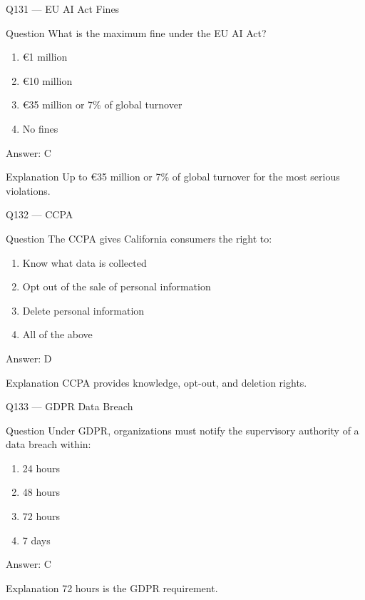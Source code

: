 \documentclass[aspectratio=169,8pt]{beamer}
\begin{document}
	\begin{frame}{Q131 --- EU AI Act Fines}
		\begin{block}{Question}
			What is the maximum fine under the EU AI Act?
		\end{block}
		\begin{enumerate}
			\item €1 million
			\item €10 million
			\item €35 million or 7\% of global turnover
			\item No fines
		\end{enumerate}
		\begin{exampleblock}{Answer: C}\end{exampleblock}
		\begin{block}{Explanation}
			Up to €35 million or 7\% of global turnover for the most serious violations.
		\end{block}
	\end{frame}
	
	\begin{frame}{Q132 --- CCPA}
		\begin{block}{Question}
			The CCPA gives California consumers the right to:
		\end{block}
		\begin{enumerate}
			\item Know what data is collected
			\item Opt out of the sale of personal information
			\item Delete personal information
			\item All of the above
		\end{enumerate}
		\begin{exampleblock}{Answer: D}\end{exampleblock}
		\begin{block}{Explanation}
			CCPA provides knowledge, opt-out, and deletion rights.
		\end{block}
	\end{frame}
	
	\begin{frame}{Q133 --- GDPR Data Breach}
		\begin{block}{Question}
			Under GDPR, organizations must notify the supervisory authority of a data breach within:
		\end{block}
		\begin{enumerate}
			\item 24 hours
			\item 48 hours
			\item 72 hours
			\item 7 days
		\end{enumerate}
		\begin{exampleblock}{Answer: C}\end{exampleblock}
		\begin{block}{Explanation}
			72 hours is the GDPR requirement.
		\end{block}
	\end{frame}
	
\end{document}
